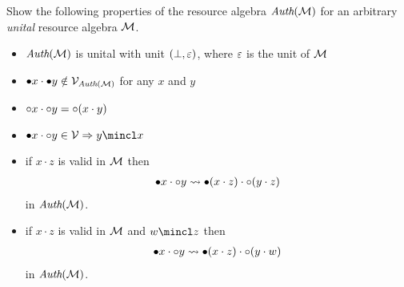 \begin{exercise}
  Show the following properties of the resource algebra $\textit{Auth}(\mathcal{M})$ for an arbitrary \emph{unital} resource algebra $\mathcal{M}$.
  \begin{itemize}
  \item $\textit{Auth}(\mathcal{M})$ is unital with unit $(\bot, \varepsilon)$, where $\varepsilon$ is the unit of $\mathcal{M}$
  \item $\mathord{\bullet} x \cdot \mathord{\bullet} y \notin \mathcal{V}_{\textit{Auth}(\mathcal{M})}$ for any $x$ and $y$
  \item $\mathord{\circ} x \cdot \mathord{\circ} y = \mathord{\circ} (x \cdot y)$
  \item $\authfull x \cdot \authfrag y \in \Vl \implies y \mincl x$
  \item if $x \cdot z$ is valid in $\mathcal{M}$ then
    \begin{align*}
      \mathord{\bullet} x \cdot \mathord{\circ} y \rightsquigarrow \mathord{\bullet} (x \cdot z) \cdot \mathord{\circ} (y \cdot z)
    \end{align*}
    in $\textit{Auth}(\mathcal{M})$.
  \item if $x \cdot z$ is valid in $\mathcal{M}$ and $w \mincl z$ then
    \begin{align*}
      \mathord{\bullet} x \cdot \mathord{\circ} y \rightsquigarrow \mathord{\bullet} (x \cdot z) \cdot \mathord{\circ} (y \cdot w)
    \end{align*}
    in $\textit{Auth}(\mathcal{M})$.
  \end{itemize}
\end{exercise}


